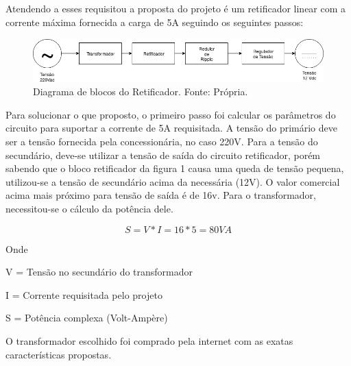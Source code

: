 				Atendendo a esses requisitou a proposta do projeto é um retificador linear com 				a corrente máxima fornecida a carga de 5A seguindo os seguintes passos:
				
                \begin{figure}[!htb]
            		\centering
            		\includegraphics[scale= 0.5]{figuras/Diagrama_Retificador.png}
            		\caption{Diagrama de blocos do Retificador. Fonte: Própria.}
            		\label{diagrama-retificador}
            	\end{figure}
            	
				Para solucionar o que proposto, o primeiro passo foi calcular os parâmetros do 				circuito para suportar a corrente de 5A requisitada. A tensão do primário deve 				ser a tensão fornecida pela concessionária, no caso 220V. Para a tensão do 						secundário, deve-se utilizar a tensão de saída do circuito retificador, porém 					sabendo que o bloco retificador da figura 1 causa uma queda de tensão pequena, 				utilizou-se a tensão de secundário acima da necessária (12V). O valor 							comercial acima mais próximo para tensão de saída é de 16v. Para o 								transformador, necessitou-se o cálculo da potência dele.

          	  	\begin{equation}
                	S = V*I = 16*5 = 80VA
            	\end{equation}
            	
				Onde
				
				V = Tensão no secundário do transformador
				
				I = Corrente requisitada pelo projeto
				
				S = Potência complexa (Volt-Ampère)

				O transformador escolhido foi comprado pela internet com as exatas 								características propostas.

